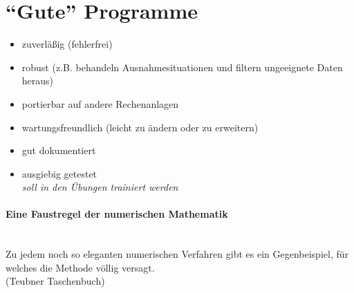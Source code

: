 \documentclass[ngerman,fontsize=11pt, paper=a4, parskip=half, titlepage=true, toc=bib]{scrbook}
\begin{document}
    	    \section{\enquote{Gute} Programme}
    	    \begin{itemize}
    	    	\item zuverläßig (fehlerfrei)
    	    	\item robust (z.B. behandeln Ausnahmesituationen und filtern
    	    	ungeeignete Daten heraus)
    	    	\item portierbar auf andere Rechenanlagen
    	    	\item wartungsfreundlich (leicht zu ändern oder zu erweitern)
    	    	\item gut dokumentiert
    	    	\item ausgiebig getestet \\   
    	    	{\small \it soll in den Übungen trainiert werden}
    	    	\end{itemize}
    	    	
    	    \paragraph{Eine Faustregel der numerischen Mathematik}~\\
    	    Zu jedem noch so eleganten numerischen Verfahren gibt es ein Gegenbeispiel,
    	    für welches die Methode völlig versagt. \\
    	    {\tiny(Teubner Taschenbuch)}
    	    
\end{document}
